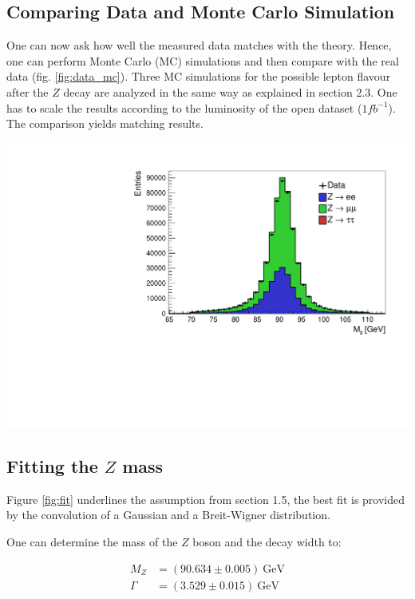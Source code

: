 \documentclass[12pt, a4paper, bibliography=totoc]{scrartcl}
\begin{document}
\begin{multicols}{2}
\subsection{Comparing Data and Monte Carlo Simulation}
One can now ask how well the measured data matches with the theory. 
Hence, one can perform Monte Carlo (MC) simulations and then compare with the real data (fig. \ref{fig:data_mc}). 
Three MC simulations for the possible lepton flavour after the $Z$ decay are analyzed in the same way as explained in section 2.3. 
One has to scale the results according to the luminosity of the open dataset ($1 fb^{-1}$).
The comparison yields matching results.
\begin{center}
	\includegraphics[width=\linewidth]{fig/vergleich_data_mc_final.pdf}
	\label{fig:data_mc}
\end{center}


\subsection{Fitting the $Z$ mass}
Figure \ref{fig:fit} underlines the assumption from section 1.5, the best fit is provided by the convolution of a Gaussian and a Breit-Wigner distribution. 

One can determine the mass of the $Z$ boson and the decay width to: 

\begin{align}
M_Z &= (90.634 \pm 0.005) \ \text{GeV}\\
\Gamma &= (3.529 \pm 0.015) \ \text{GeV}
\end{align}


\end{multicols}
\end{document}
